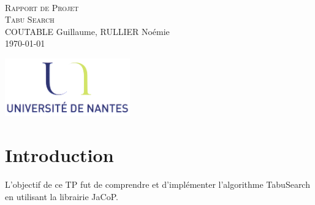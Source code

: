 \documentclass[a4paper,10pt]{article}
\begin{document}
\fancyhead[LE,CE,RE,LO,CO,RO]{}
\fancyfoot[LE,CE,RE,LO,CO,RO]{}
\renewcommand{\headrulewidth}{0.4pt}
\renewcommand{\footrulewidth}{0.4pt}

\begin{titlepage}

\vspace*{\fill}~
\begin{center}
{\large \textsc{Rapport de Projet}} \\
\textsc{Tabu Search} \\
\vspace{0.5cm}
COUTABLE Guillaume, RULLIER Noémie \\
\today
\end{center}
\vspace*{\fill}

\begin{center}
\noindent 
\includegraphics[height=2.5cm]{Images/universite.png}
\end{center}
\pagebreak
\end{titlepage}

\newpage
\tableofcontents  

\newpage
\pagestyle{fancy}

\section{Introduction}
L'objectif de ce TP fut de comprendre et d'implémenter l'algorithme TabuSearch en utilisant la librairie JaCoP.

\end{document}
